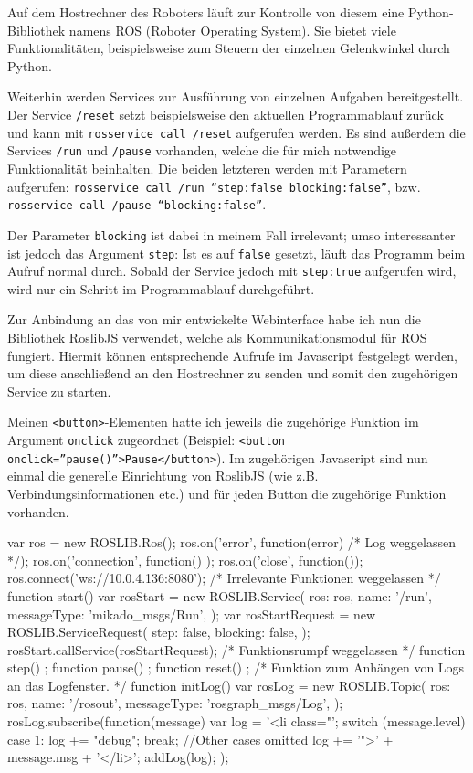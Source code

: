Auf dem Hostrechner des Roboters läuft zur Kontrolle von diesem eine Python-Bibliothek
namens ROS (Roboter Operating System). Sie bietet viele Funktionalitäten, beispielsweise
zum Steuern der einzelnen Gelenkwinkel durch Python.

Weiterhin werden Services zur Ausführung von einzelnen Aufgaben bereitgestellt.
Der Service \texttt{/reset} setzt beispielsweise den aktuellen Programmablauf
zurück und kann mit \texttt{rosservice call /reset} aufgerufen werden. Es sind
außerdem die Services \texttt{/run} und \texttt{/pause} vorhanden, welche die für
mich notwendige Funktionalität beinhalten. Die beiden letzteren werden mit Parametern
aufgerufen: \texttt{rosservice call /run ``step:false blocking:false''}, bzw.
\texttt{rosservice call /pause ``blocking:false''}.

Der Parameter \texttt{blocking} ist dabei in meinem Fall irrelevant; umso interessanter
ist jedoch das Argument \texttt{step}: Ist es auf \texttt{false} gesetzt, läuft
das Programm beim Aufruf normal durch. Sobald der Service jedoch mit \texttt{step:true}
aufgerufen wird, wird nur ein Schritt im Programmablauf durchgeführt.

Zur Anbindung an das von mir entwickelte Webinterface habe ich nun die Bibliothek
RoslibJS verwendet, welche als Kommunikationsmodul für ROS fungiert. Hiermit können
entsprechende Aufrufe im Javascript festgelegt werden, um diese anschließend an
den Hostrechner zu senden und somit den zugehörigen Service zu starten.

Meinen \texttt{<button>}-Elementen hatte ich jeweils die zugehörige Funktion im
Argument \texttt{onclick} zugeordnet (Beispiel: \texttt{<button onclick=''pause()''>Pause</button>}).
Im zugehörigen Javascript sind nun einmal die generelle Einrichtung von RoslibJS
(wie z.B. Verbindungsinformationen etc.) und für jeden Button die zugehörige Funktion
vorhanden.

\begin{code}[language=javascript, caption={Serviceaufruf durch RoslibJS}]
var ros = new ROSLIB.Ros();
ros.on('error', function(error) {/* Log weggelassen */});
ros.on('connection', function() {});
ros.on('close', function(){});
ros.connect('ws://10.0.4.136:8080');
/* Irrelevante Funktionen weggelassen */
function start() {
	var rosStart = new ROSLIB.Service({
		ros: ros, name: '/run', messageType: 'mikado_msgs/Run',
	});
	var rosStartRequest = new ROSLIB.ServiceRequest({
		step: false, blocking: false,
	});
	rosStart.callService(rosStartRequest);
}
/* Funktionsrumpf weggelassen */
function step() {};
function pause() {};
function reset() {};
/* Funktion zum Anhängen von Logs an das Logfenster. */
function initLog() {
	var rosLog = new ROSLIB.Topic({
		ros: ros, name: '/rosout', messageType: 'rosgraph_msgs/Log',
	});
	rosLog.subscribe(function(message) {
		var log = '<li class="';
		switch (message.level) {
			case 1:
				log += "debug";
				break;
		} //Other cases omitted
		log += '">' + message.msg + '</li>';
		addLog(log);
	});
}
\end{code}

